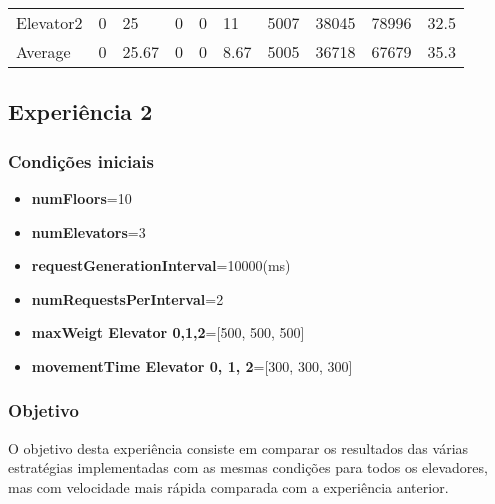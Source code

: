 \documentclass[a4paper]{article}
\begin{document}
\begin{table}[h]
\begin{tabular}{@{}llllllllll@{}}
Elevator2 & 0        & 25            & 0           & 0                                                               & 11                                                                  & 5007                                                         & 38045                                                 & 78996                                                   & 32.5         \\
Average   & 0     & 25.67         & 0        & 0                                                               & 8.67                                                               & 5005                                                         & 36718                                                 &  67679                                                  & 35.3          \\ \bottomrule
\end{tabular}
\end{table}

\subsection{Experiência 2}

\subsubsection{Condições iniciais}

\begin{itemize}
\item \textbf{numFloors}=10
\item \textbf{numElevators}=3
\item \textbf{requestGenerationInterval}=10000(ms)
\item \textbf{numRequestsPerInterval}=2
\item \textbf{maxWeigt Elevator 0,1,2}=[500, 500, 500]
\item \textbf{movementTime Elevator 0, 1, 2}=[300, 300, 300]
\end{itemize}

\subsubsection{Objetivo} 

O objetivo desta experiência consiste em comparar os resultados das várias estratégias implementadas com as mesmas condições para todos os elevadores, mas com velocidade mais rápida comparada com a experiência anterior.
\end{document}
